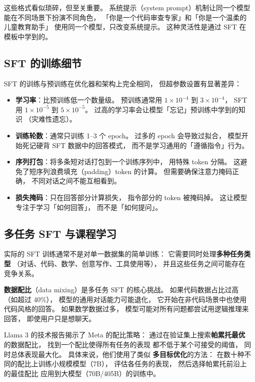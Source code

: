 这些格式看似琐碎，但至关重要。
系统提示（system prompt）机制让同一个模型
能在不同场景下扮演不同角色，
「你是一个代码审查专家」和「你是一个温柔的儿童教育助手」
使用同一个模型，只改变系统提示。
这种灵活性是通过 SFT 在模板中学到的。

\subsection{SFT 的训练细节}

SFT 的训练与预训练在优化器和架构上完全相同，
但超参数设置有显著差异：
\begin{itemize}[noitemsep]
  \item \textbf{学习率}：比预训练低一个数量级。
        预训练通常用 $1 \times 10^{-4}$ 到 $3 \times 10^{-4}$，
        SFT 用 $1 \times 10^{-5}$ 到 $5 \times 10^{-5}$。
        过高的学习率会让模型「忘记」预训练中学到的知识
       （灾难性遗忘）。
  \item \textbf{训练轮数}：通常只训练 1--3 个 epoch。
        过多的 epoch 会导致过拟合，
        模型开始死记硬背 SFT 数据中的回答模式，
        而不是学习通用的「遵循指令」行为。
  \item \textbf{序列打包}：将多条短对话打包到一个训练序列中，
        用特殊 token 分隔。
        这避免了短序列浪费填充（padding）token 的计算。
        但需要确保注意力掩码正确，
        不同对话之间不能互相看到。
  \item \textbf{损失掩码}：只在回答部分计算损失，
        指令部分的 token 被掩码掉。
        这让模型专注于学习「如何回答」，
        而不是「如何提问」。
\end{itemize}

\subsection{多任务 SFT 与课程学习}

实际的 SFT 训练通常不是对单一数据集的简单训练：
它需要同时处理\textbf{多种任务类型}
（对话、代码、数学、创意写作、工具使用等），
并且这些任务之间可能存在竞争关系。

\textbf{数据配比}（data mixing）是多任务 SFT 的核心挑战。
如果代码数据占比过高（如超过 40\%），
模型的通用对话能力可能退化，
它开始在非代码场景中也使用代码风格的回答。
如果数学数据过多，
模型可能对所有问题都尝试用逻辑推理来回答，
即使用户只是想聊天。

Llama 3 的技术报告揭示了 Meta 的配比策略：
通过在验证集上搜索\textbf{帕累托最优}的数据配比，
找到一个配比使得所有任务的表现
都不低于某个可接受的阈值，
同时总体表现最大化。
具体来说，他们使用了类似
\textbf{多目标优化}的方法：
在数十种不同的配比上训练小规模模型（7B），
评估各任务的表现，
然后选择帕累托前沿上的最佳配比
应用到大模型（70B/405B）的训练中。

